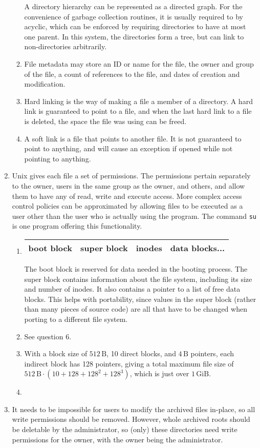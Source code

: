 \documentclass[11pt]{article}
\begin{document}
\begin{enumerate}
\begin{enumerate}
    A directory hierarchy can be represented as a directed graph. For the convenience of garbage collection routines, it is usually required to by acyclic, which can be enforced by requiring directories to have at most one parent. In this system, the directories form a tree, but can link to non-directories arbitrarily.
  \item File metadata may store an ID or name for the file, the owner and group of the file, a count of references to the file, and dates of creation and modification.
  \item Hard linking is the way of making a file a member of a directory. A hard link is guaranteed to point to a file, and when the last hard link to a file is deleted, the space the file was using can be freed.
  \item A soft link is a file that points to another file. It is not guaranteed to point to anything, and will cause an exception if opened while not pointing to anything.
  \end{enumerate}
\item
  Unix gives each file a set of permissions. The permissions pertain separately to the owner, users in the same group as the owner, and others, and allow them to have any of read, write and execute access. More complex access control policies can be approximated by allowing files to be executed as a user other than the user who is actually using the program. The command \texttt{su} is one program offering this functionality.

  \begin{enumerate}
  \item
    \begin{tabular}{|c|c|c|c|}
      \hline
      boot block & super block & inodes & data blocks... \\
      \hline
    \end{tabular}

    The boot block is reserved for data needed in the booting process. The super block contains information about the file system, including its size and number of inodes. It also contains a pointer to a list of free data blocks. This helps with portability, since values in the super block (rather than many pieces of source code) are all that have to be changed when porting to a different file system.
  \item See question 6.
  \item With a block size of \(512\,\mathrm{B}\), 10 direct blocks, and \(4\,\mathrm{B}\) pointers, each indirect block has 128 pointers, giving a total maximum file size of \(512\,\mathrm{B}\cdot(10+128+128^2+128^3)\), which is just over \(1\,\mathrm{GiB}\).
  \item
  \end{enumerate}
\item
  It needs to be impossible for users to modify the archived files in-place, so all write permissions should be removed. However, whole archived roots should be deletable by the administrator, so (only) these directories need write permissions for the owner, with the owner being the administrator.


\end{enumerate}
\end{document}
